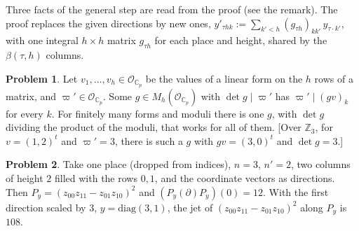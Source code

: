 \documentclass[reqno]{amsart}
\theoremstyle{plain}
\theoremstyle{definition}
\newtheorem{problem}{Problem}[section]
\theoremstyle{remark}
\newcommand{\Z}{\mathbb{Z}}
\newcommand{\C}{\mathbb{C}}
\newcommand{\Op}{\mathcal{O}_{\C_p}}
\begin{document}
Three facts of the general step are read from the proof (see the remark).  The proof replaces the given directions by new ones, \(y'_{\tau h k} := \sum_{k' < h} (g_{\tau h})_{k k'}\, y_{\tau \cdot k'}\), with one integral \(h \times h\) matrix \(g_{\tau h}\) for each place and height, shared by the \(\beta(\tau, h)\) columns.

\begin{problem}\label{pr:eliminate}
Let \(v_1, \dots, v_h \in \Op\) be the values of a linear form on the \(h\) rows of a matrix, and \(\varpi' \in \Op\).  Some \(g \in M_h(\Op)\) with \(\det g \mid \varpi'\) has \(\varpi' \mid (g v)_k\) for every \(k\).  For finitely many forms and moduli there is one \(g\), with \(\det g\) dividing the product of the moduli, that works for all of them.  [Over \(\Z_3\), for \(v = (1, 2)^t\) and \(\varpi' = 3\), there is such a \(g\) with \(gv = (3, 0)^t\) and \(\det g = 3\).]
\end{problem}

\begin{problem}\label{pr:det-column}
Take one place (dropped from indices), \(n = 3\), \(n' = 2\), two columns of height \(2\) filled with the rows \(0, 1\), and the coordinate vectors as directions.  Then \(P_y = (z_{00} z_{11} - z_{01} z_{10})^2\) and \((P_y(\partial) P_y)(0) = 12\).  With the first direction scaled by \(3\), \(y = \mathrm{diag}(3, 1)\), the jet of \((z_{00} z_{11} - z_{01} z_{10})^2\) along \(P_y\) is \(108\).
\end{problem}
\end{document}
